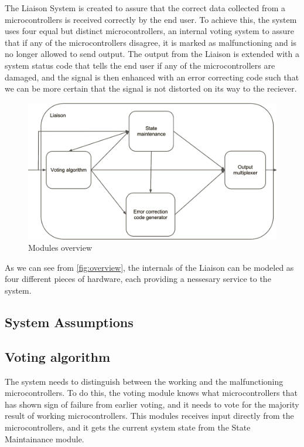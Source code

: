 The Liaison System is created to assure that the correct data collected from a microcontrollers is received correctly by the end user.
To achieve this, the system uses four equal but distinct microcontrollers, an internal voting system to assure that if any of the microcontrollers
disagree, it is marked as malfunctioning and is no longer allowed to send output. The output from the Liaison is extended with a system status
code that tells the end user if any of the microcontrollers are damaged, and the signal is then enhanced with an error correcting code such that
we can be more certain that the signal is not distorted on its way to the reciever.

\begin{figure}[h]
\includegraphics[width=15cm]{design/fig_overview}
\caption{Modules overview}
\label{fig:overview}
\end{figure}

As we can see from \autoref{fig:overview}, the internals of the Liaison can be modeled as four different pieces of hardware, each providing a
nessesary service to the system.

\subsection{System Assumptions}


\subsection{Voting algorithm}
The system needs to distinguish between the working and the malfunctioning microcontrollers. To do this, the voting module knows what microcontrollers
that has shown sign of failure from earlier voting, and it needs to vote for the majority result of working microcontrollers. This modules
receives input directly from the microcontrollers, and it gets the current system state from the State Maintainance module.

